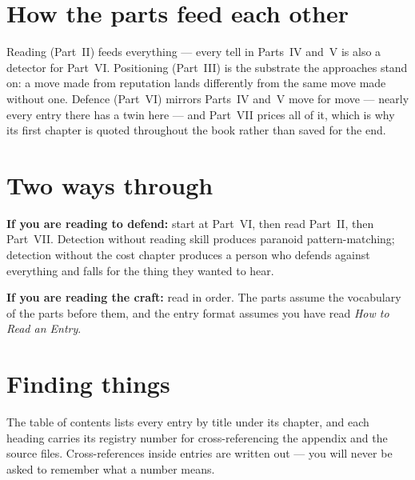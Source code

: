 \section*{How the parts feed each other}

Reading (Part~II) feeds everything --- every tell in Parts~IV and~V is
also a detector for Part~VI. Positioning (Part~III) is the substrate the
approaches stand on: a move made from reputation lands differently from
the same move made without one. Defence (Part~VI) mirrors Parts~IV
and~V move for move --- nearly every entry there has a twin here --- and
Part~VII prices all of it, which is why its first chapter is quoted
throughout the book rather than saved for the end.

\section*{Two ways through}

\textbf{If you are reading to defend:} start at Part~VI, then read
Part~II, then Part~VII. Detection without reading skill produces paranoid
pattern-matching; detection without the cost chapter produces a person
who defends against everything and falls for the thing they wanted to
hear.

\textbf{If you are reading the craft:} read in order. The parts assume
the vocabulary of the parts before them, and the entry format assumes you
have read \emph{How to Read an Entry}.

\section*{Finding things}

The table of contents lists every entry by title under its chapter, and
each heading carries its registry number for cross-referencing the
appendix and the source files. Cross-references inside entries are
written out --- you will never be asked to remember what a number means.
